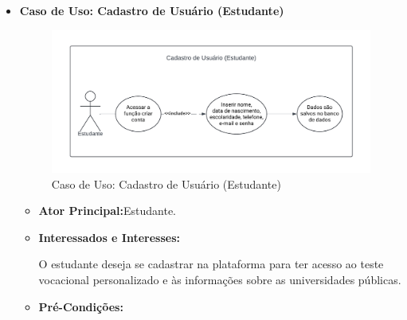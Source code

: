 \begin{itemize}
    \item \textbf{Caso de Uso: Cadastro de Usuário (Estudante)}

    \begin{figure}[ht]
        \centering
        \includegraphics[scale=0.8]{caso-de-uso_cadastro-de-usuario-estudante.png}
        \caption{Caso de Uso: Cadastro de Usuário (Estudante)}
        \label{fig:enter-label}
    \end{figure}
    
    \begin{itemize}
        \item \textbf{Ator Principal:}Estudante.
        \item \textbf{Interessados e Interesses:}

        O estudante deseja se cadastrar na plataforma para ter acesso ao teste vocacional personalizado e às informações sobre as universidades públicas.

        \item \textbf{Pré-Condições:}


\end{itemize}
\end{itemize}
